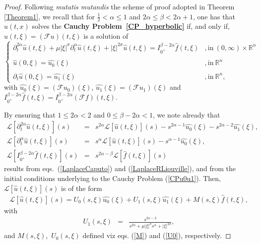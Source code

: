 \documentclass{amsart}
\theoremstyle{definition}
\theoremstyle{remark}
\numberwithin{equation}{section}
\begin{document}
		\begin{proof}
			Following {\it mutatis mutandis} the scheme of proof adopted in Theorem \ref{Theorem1}, we recall that for $\frac{1}{2}<\alpha\leq 1$ and $2\alpha\leq \beta< 2\alpha+1$, one has that $u(t,x)$ solves the {\bf Cauchy Problem~\ref{CP_hyperbolic}} if, and only if, $\widehat{u}(t,\xi)=(\mathcal{F}u)(t,\xi)$ is a solution of 
			\begin{equation}\label{CPu0u1}
				\begin{cases}
					\displaystyle \partial^{2\alpha}_t \widehat{u}(t,\xi)+\mu |\xi|^{\sigma}\partial^\alpha_t \widehat{u}(t,\xi)+|\xi|^{2\sigma} \widehat{u}(t,\xi)=I^{\beta-2\alpha}_{0^+}\widehat{f}(t,\xi)&,\mbox{in}~(0,\infty)\times \mathbb{R}^n \\ \ \\ 
					\widehat{u}(0,\xi)=\widehat{u_0}(\xi)&,\mbox{in}~\mathbb{R}^n \\ \ \\
					\partial_t\widehat{u}(0,\xi)=\widehat{u_1}(\xi)&,\mbox{in}~\mathbb{R}^n,
				\end{cases}
			\end{equation}
			with $\widehat{u_0}(\xi)=(\mathcal{F}u_0)(\xi)$, $\widehat{u_1}(\xi)=(\mathcal{F}u_1)(\xi)$ and $I^{\beta-2\alpha}_{0^+}\widehat{f}(t,\xi)=I^{\beta-2\alpha}_{0^+}(\mathcal{F}f)(t,\xi)$. 
			
			By ensuring that $1\leq 2\alpha<2$ and $0\leq \beta-2\alpha< 1$, we note already that 
			\begin{eqnarray*}
				\mathcal{L}[\partial^{2\alpha}_t \widehat{u}(t,\xi)](s)&=&s^{2\alpha}\mathcal{L}[ \widehat{u}(t,\xi)](s)-s^{2\alpha-1}\widehat{u_0}(\xi)-s^{2\alpha-2}\widehat{u_1}(\xi), \\
				\mathcal{L}[\partial^{\alpha}_t \widehat{u}(t,\xi)](s)&=&s^{\alpha}\mathcal{L}[ \widehat{u}(t,\xi)](s)-s^{\alpha-1}\widehat{u_0}(\xi), \\
				\mathcal{L}[I^{\beta-2\alpha}_{0^+} \widehat{f}(t,\xi)](s)&=&s^{2\alpha-\beta}\mathcal{L}[ \widehat{f}(t,\xi)](s)
			\end{eqnarray*}
			results from eqs.~(\ref{LaplaceCaputo}) and (\ref{LaplaceRLiouville}), and from the initial conditions underlying to the Cauchy Problem (\ref{CPu0u1}).
			Then, $\mathcal{L}[\widehat{u}(t,\xi)](s)$ is of the form
			\begin{eqnarray}
				\label{Uss}\mathcal{L}[\widehat{u}(t,\xi)](s)=U_0(s,\xi)\widehat{u_0}(\xi)+U_1(s,\xi)\widehat{u_1}(\xi)+M(s,\xi) \widehat{f}(t,\xi),
			\end{eqnarray}
			with
			\begin{eqnarray}
				\label{U1}U_1(s,\xi)&=&\frac{s^{2\alpha-2}}{s^{2\alpha}+\mu |\xi|^\sigma s^{\alpha} +|\xi|^{2\sigma}},
			\end{eqnarray}
			and $M(s,\xi)$,~$U_0(s,\xi)$ defined viz eqs. (\ref{M}) and (\ref{U0}), respectively.
			

\end{proof}
\end{document}
